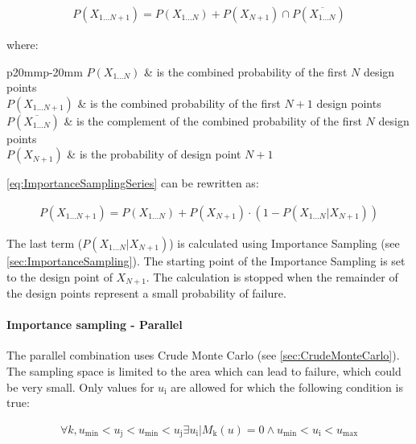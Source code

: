 {\begin{align}
\label{eq:ImportanceSamplingSeries}
P\left(X_{1 \ldots N+1}\right) = P\left(X_{1 \ldots N}\right) + P\left(X_{N+1}\right) \cap P\left(\overline{X_{1 \ldots N}}\right)
\end{align}

where:

\begin{longtable*}{p{20mm}p{\textwidth-24pt-20mm}}  
	$P\left(X_{1 \ldots N}\right)$ & is the combined probability of the first $N$ design points \\
	$P\left(X_{1 \ldots N+1}\right)$ & is the combined probability of the first $N+1$ design points \\
	$P\left(\overline{X_{1 \ldots N}}\right)$ & is the complement of the combined probability of the first $N$ design points \\
	$P\left(X_{N+1}\right)$ & is the probability of design point $N+1$
\end{longtable*}

\autoref{eq:ImportanceSamplingSeries} can be rewritten as:

\begin{align}
\label{eq:ImportanceSamplingSeriesCond}
P\left(X_{1 \ldots N+1}\right) = P\left(X_{1 \ldots N}\right) + P\left(X_{N+1}\right) \cdot \left(1 - P\left(X_{1 \ldots N} | X_{N+1}\right)\right) 
\end{align}


The last term ($P\left(X_{1 \ldots N} | X_{N+1}\right)$) is calculated using Importance Sampling (see \autoref{sec:ImportanceSampling}).
The starting point of the Importance Sampling is set to the design point of $X_{N+1}$. The calculation is stopped when the remainder of the design points represent a small probability of failure.

\paragraph*{Importance sampling - Parallel}

The parallel combination uses Crude Monte Carlo (see \autoref{sec:CrudeMonteCarlo}).
The sampling space is limited to the area which can lead to failure,
which could be very small.
Only values for $u_{\text{i}}$ are allowed for which the following condition is true:

\begin{align}
\forall k, u_{\text{min}} < u_{\text{j}} < u_{\text{min}} < u_{\text{j} } \exists u_{\text{i}} | M_{\text{k}}\left(u\right) = 0 \land u_{\text{min}} < u_{\text{i}} < u_{\text{max}}
\end{align}

}
